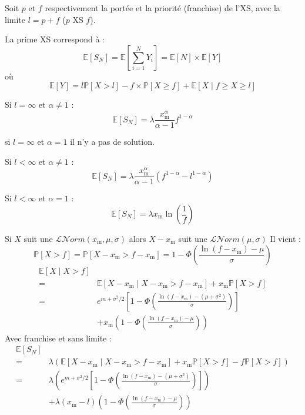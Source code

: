 \begin{f}
Soit \(p\) et \(f\) respectivement la portée et la priorité (franchise) de l'XS, avec la limite \(l=p+f\) (\(p\) XS \(f\)).

La prime XS correspond à :
\[
\mathbb{E}\left[S_N\right]=\mathbb{E}\left[\sum_{i=1}^{N} Y_{i}\right]=\mathbb{E}[N]\times \mathbb{E}[Y]
\]
où
\[
\mathbb{E}[Y]= l \mathbb{P}[X>l] - f \times \mathbb{P}[X\geq f] + \mathbb{E}[X\mid f\geq X\geq l]
\]


Si \(l=\infty\) et \(\alpha \neq 1\) :
\[
\mathbb{E}[S_N] = \lambda \frac{x_\mathrm{m}^{\alpha}}{\alpha -1}f^{1-\alpha} 
\]

si  \(l=\infty\) et \(\alpha = 1\) il n'y a pas de solution.

Si \(l<\infty\) et \(\alpha \neq 1\) :
\[
\mathbb{E}[S_N] = \lambda \frac{x_\mathrm{m}^{\alpha}}{\alpha -1}\left( f^{1-\alpha} -l^{1-\alpha} \right)
\]

Si \(l<\infty\) et \(\alpha = 1\) :
\[
\mathbb{E}[S_N] = \lambda x_\mathrm{m} \ln \left(  \frac{1}{f}\right)
\]
\end{f}



\begin{f}

Si \(X\) suit une \(\mathcal{L}\mathcal{N}orm(x_\mathrm{m}, \mu, \sigma)\) alors \(X-x_\mathrm{m}\) suit une \(\mathcal{L}\mathcal{N}orm(\mu, \sigma)\)
Il vient :
\[
\mathbb{P}[X>f]=\mathbb{P}[X-x_\mathrm{m}>f-x_\mathrm{m}]=1-\Phi\left(\frac{\ln(f-x_\mathrm{m})-\mu}{\sigma}\right)
\]
\begin{align*}
	\mathbb{E}[X\mid X>f] \\ 
	= & \mathbb{E}\left[ X-x_\mathrm{m}\mid X-x_\mathrm{m}>f-x_\mathrm{m} \right]+x_\mathrm{m} \mathbb{P}[X>f]\\
	= & e ^{m+\sigma^2/2} \left[1-\Phi\left(\frac{\ln(f-x_\mathrm{m})-(\mu+\sigma^2)}{\sigma}\right) \right]\\
	& +x_\mathrm{m} \left( 1-\Phi\left(\frac{\ln(f-x_\mathrm{m})-\mu}{\sigma}\right) \right)
\end{align*}
Avec franchise et sans limite :
\begin{align*}
	\mathbb{E}[S_N] \\ 
	= & \lambda \left(\mathbb{E}\left[ X-x_\mathrm{m}\mid X-x_\mathrm{m}>f-x_\mathrm{m} \right]+x_\mathrm{m} \mathbb{P}[X>f]-f\mathbb{P}[X>f]\right)\\
	= & \lambda \left(  e ^{m+\sigma^2/2} \left[1-\Phi\left(\frac{\ln(f-x_\mathrm{m})-(\mu+\sigma^2)}{\sigma}\right) \right]\right)\\
	& +\lambda (x_\mathrm{m}-l) \left( 1-\Phi\left(\frac{\ln(f-x_\mathrm{m})-\mu}{\sigma}\right) \right)
\end{align*}

\end{f}